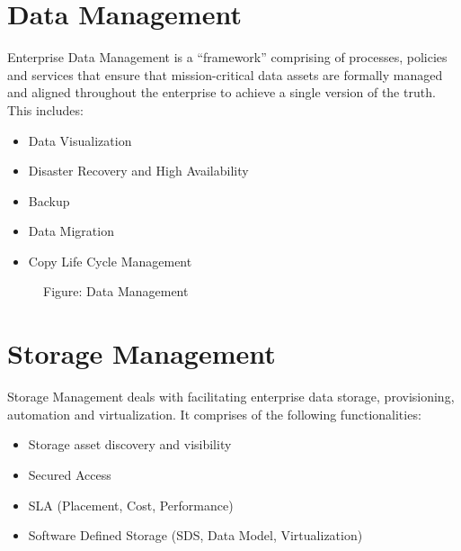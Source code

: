 \documentclass[letterpaper,10pt,english]{sphinxmanual}
\begin{document}
\section{Data Management}
\label{\detokenize{mcdmp_concepts:data-management}}
Enterprise Data Management is a “framework” comprising of processes, policies and services that ensure that mission-critical data assets are formally managed and aligned throughout the enterprise to achieve a single version of the truth.  This includes:
\begin{itemize}
\item {} 
Data Visualization

\item {} 
Disaster Recovery and High Availability

\item {} 
Backup

\item {} 
Data Migration

\item {} 
Copy Life Cycle Management

\end{itemize}

\begin{figure}[htbp]
\centering
\capstart

\noindent{}
\caption{Figure: Data Management}\label{\detokenize{mcdmp_concepts:id10}}\end{figure}


\section{Storage Management}
\label{\detokenize{mcdmp_concepts:storage-management}}
Storage Management deals with facilitating enterprise data storage, provisioning, automation and virtualization. It comprises of the following functionalities:
\begin{itemize}
\item {} 
Storage asset discovery and visibility

\item {} 
Secured Access

\item {} 
SLA (Placement, Cost, Performance)

\item {} 
Software Defined Storage (SDS, Data Model, Virtualization)

\end{itemize}
\end{document}
